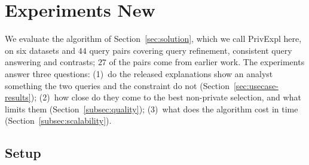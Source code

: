 \section{Experiments New}
\label{sec:experiments}

We evaluate the algorithm of Section~\ref{sec:solution}, which we call \textsf{PrivExpl} here, on six datasets and $44$ query pairs covering query refinement, consistent query answering and contrasts; $27$ of the pairs come from earlier work.
The experiments answer three questions:
(1)~do the released explanations show an analyst something the two queries and the constraint do not (Section~\ref{sec:usecase-results});
(2)~how close do they come to the best non-private selection, and what limits them (Section~\ref{subsec:quality});
(3)~what does the algorithm cost in time (Section~\ref{subsec:scalability}).

\subsection{Setup}
\label{subsec:experimental-setup}

\begin{table}[t]
\centering
\small
\caption{Datasets and the source of their query pairs. On IPUMS-CPS $|\mathcal{P}|$ depends on the attribute each question removes.}
\label{tab:datasets}
\setlength{\tabcolsep}{3pt}
\end{table}

